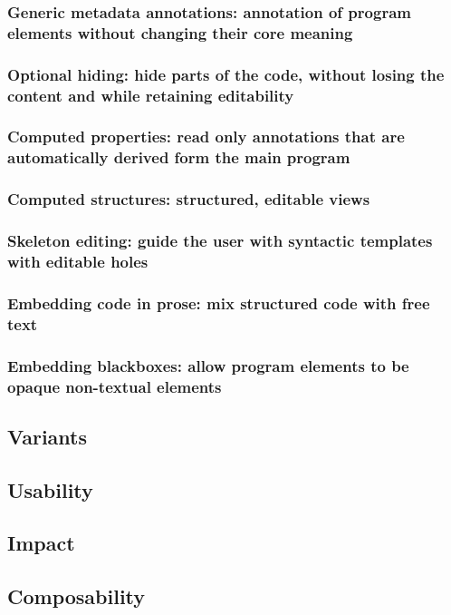 \documentclass[preprint,numbers,10pt]{sigplanconf}
\begin{document}
\subsubsection{Generic metadata annotations: annotation of program elements without changing their core meaning}
\subsubsection{Optional hiding: hide parts of the code, without losing the content and while retaining editability}
\subsubsection{Computed properties: read only annotations that are automatically derived form the main program}
\subsubsection{Computed structures: structured, editable views}
\subsubsection{Skeleton editing: guide the user with syntactic templates with editable holes}
\subsubsection{Embedding code in prose: mix structured code with free text}
\subsubsection{Embedding blackboxes: allow program elements to be opaque non-textual elements}

\subsection{Variants}

\subsection{Usability}

\subsection{Impact}

\subsection{Composability}
\end{document}
